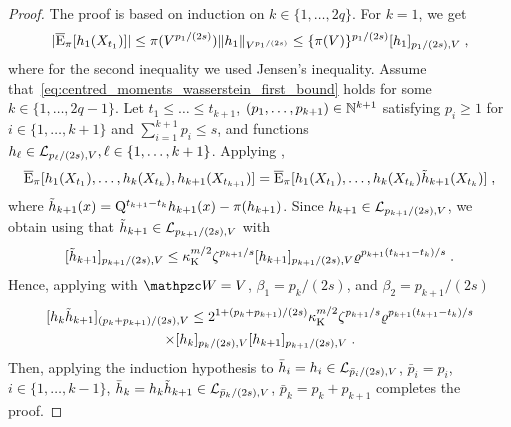 \begin{proof}
The proof is based on induction on $k \in \{1,\dots,2q\}$.  For $k = 1$, we get
\begin{equation*}
|\PEC_\pi[h_1(X_{t_1})]|
\leq \pi(V^{p_1/(2s)}) \|h_1\|_{V^{p_{1}/(2s)}}
\leq \{\pi(V)\}^{p_{1}/(2s)}
\Nnorm[p_1/(2s),V]{h_1}\eqsp,
\end{equation*}
where for the second inequality we used Jensen's inequality. Assume that~\eqref{eq:centred_moments_wasserstein_first_bound} holds for some $k \in \{1,\dots,2q-1\}$. Let $t_1 \leq \dots\leq t_{k+1}$,   $(p_1,\dots,p_{k+1})\in \nset^{k+1}$ satisfying  $p_i \geq 1$ for $i \in \{1,\dots,k+1\}$ and $\sum_{i=1}^{k+1} p_i \leq s$, and functions $h_{\ell} \in  \Lclass_{p_{\ell}/(2s),V}, \ell \in \{1,\dots,k+1\}$. Applying ,
\begin{equation*}
\PEC_\pi[h_1(X_{t_1}), \ldots, h_k(X_{t_k}), h_{k+1}(X_{t_{k+1}})] = \PEC_\pi[h_1(X_{t_1}), \ldots , h_k(X_{t_k}) \tilde h_{k+1}(X_{t_k})]\eqsp,
\end{equation*}
where $\tilde h_{k+1}(x) = \MK^{t_{k+1} - t_k} h_{k+1}(x) - \pi(h_{k+1})$.
Since $h_{k+1} \in \Lclass_{p_{k+1}/(2s),V}$, we obtain using  that $\tilde{h}_{k+1} \in \Lclass_{p_{k+1}/(2s),V}$ with
\begin{equation*}
\Nnorm[p_{k+1}/(2s),V]{\tilde h_{k+1}} \leq \boundmetric^{m/2} \constlemqnpi^{p_{k+1}/s}  \Nnorm[p_{k+1}/(2s), V]{h_{k+1}} \ratewas^{p_{k+1}(t_{k+1}-t_k)/s}\eqsp.
\end{equation*}
Hence, applying  with $\lyapW = V$, $\beta_1 = p_{k}/(2s)$, and $\beta_2 = p_{k+1}/(2s)$
\begin{multline*}
\Nnorm[(p_k + p_{k+1})/(2s),V]{h_k \tilde h_{k+1}}
\leq 2^{1 + (p_k+p_{k+1})/(2s)} \boundmetric^{m/2} \constlemqnpi^{p_{k+1}/s} \ratewas^{p_{k+1}(t_{k+1}-t_k)/s} \\ \times \Nnorm[p_k/(2s), V]{h_k}  \Nnorm[p_{k+1}/(2s),V]{h_{k+1}} \eqsp.
\end{multline*}
Then, applying the induction hypothesis to $\bar{h}_i = h_i \in \Lclass_{\bar{p}_{i}/(2s),V}$, $\bar{p}_i = p_i$, $i \in\{1,\ldots,k-1\}$, $\bar{h}_k = h_k \tilde h_{k+1} \in \Lclass_{\bar{p}_{k}/(2s),V}$, $\bar{p}_k = p_k + p_{k+1}$ completes the proof.
\end{proof}

